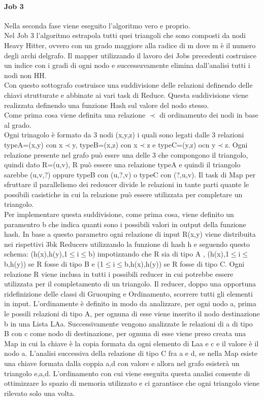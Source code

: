 \documentclass[paper=a4, fontsize=11pt]{scrartcl}	%
\numberwithin{equation}{section}															%
\numberwithin{figure}{section}																%
\numberwithin{table}{section}																%
\begin{document}
\paragraph{Job 3}
Nella seconda fase viene eseguito l'algoritmo vero e proprio.\\
Nel Job 3 l'algoritmo estrapola tutti quei triangoli che sono composti da nodi Heavy Hitter, ovvero con un grado maggiore alla radice di m dove m è il numero degli archi delgrafo.
Il mapper utilizzando il lavoro dei Jobs precedenti costruisce un indice con i gradi di ogni nodo e successuvamente elimina dall'analisi tutti i nodi non HH.\\
Con questo sottografo costruisce una suddivisione delle relazioni definendo delle chiavi strutturate e abbinate ai vari task di Reduce. Questa suddivisione viene realizzata definendo una funzione Hash sul valore del nodo stesso.\\
Come prima cosa viene definita una relazione $\prec$ di ordinamento dei nodi in base al grado.\\
Ogni trinagolo è formato da  3 nodi (x,y,z) i quali sono legati dalle 3 relazioni typeA=(x,y) con x$\prec$y, typeB=(x,z) con x$\prec$z e typeC=(y,z) ocn y$\prec$z. Ogni relazione presente nel grafo può essre una delle 3 che compongono il triangolo, quindi dato R=(u,v), R può essere una relazione typeA e quindi  il triangolo sarebbe (u,v,?) oppure typeB con (u,?,v) o typeC con (?,u,v).
Il task di Map per sfruttare il parallelismo dei redoucer divide le relazioni in tante parti quante le possibili casistiche in cui la relazione può essere utilizzata per completare un triangolo.\\
Per implementare questa suddivisione, come prima cosa, viene definito un paramentro b che indica quanti sono i possibili valori in output della funzione hash. In base a questo parametro ogni relazione di input R(x,y) viene distribuita nei rispettivi 3bk Reducers utilizzando la funzione di hash h e seguendo questo schema: (h(x),h(y),1$\leq$i$\leq$b) impotizzando che R sia di tipo A , (h(x),1$\leq$i$\leq$b,h(y)) se R fosse di tipo B e (1$\leq$i$\leq$b,h(x),h(y)) se R fosse di tipo C. Ogni relazione R viene inclusa in tutti i possibili reducer in cui potrebbe essere utilizzata per il completamento di un triangolo.
Il reducer, doppo una opportuna ridefinizione delle classi di Gruouping e Ordinamento, scorrere tutti gli elementi in input. L'ordinamente è definito in modo da analizzare, per ogni nodo a, prima le possili relazioni di tipo A, per ognuna di esse viene inserito il nodo destinazione b in una Lista LAa. Successivamente vengono analizzate le relazioni di a di tipo B con c come nodo di destinazione, per ognuna di esse viene preso creata una Map in cui la chiave è la copia formata da ogni elemento di Laa e c e il valore è il nodo a.
L'analisi successiva della relazione di tipo C fra a e d, se nella Map esiste una chiave formata dalla coppia a,d con valore e allora nel grafo esisterà un triangolo e,a,d.
L'ordinamento con cui viene eseguita questa analisi consente di ottimizzare lo spazio di memoria utilizzato e ci garantisce che ogni triangolo viene rilevato solo una volta.
\end{document}
